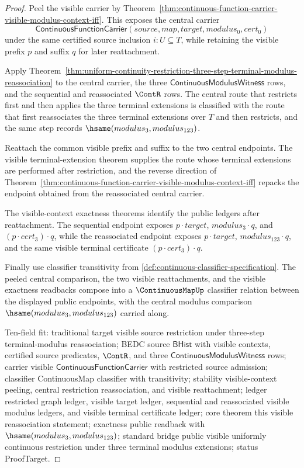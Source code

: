 \begin{proof}
Peel the visible carrier by Theorem~\ref{thm:continuous-function-carrier-visible-modulus-context-iff}. This exposes the central carrier
$$
\mathsf{ContinuousFunctionCarrier}(source,map,target,modulus_0,cert_0)
$$
under the same certified source inclusion $i:U\subseteq T$, while retaining the visible prefix $p$ and suffix $q$ for later reattachment.

Apply Theorem~\ref{thm:uniform-continuity-restriction-three-step-terminal-modulus-reassociation} to the central carrier, the three $\mathsf{ContinuousModulusWitness}$ rows, and the sequential and reassociated $\ContR$ rows. The central route that restricts first and then applies the three terminal extensions is classified with the route that first reassociates the three terminal extensions over $T$ and then restricts, and the same step records $\hsame(modulus_3,modulus_{123})$.

Reattach the common visible prefix and suffix to the two central endpoints. The visible terminal-extension theorem supplies the route whose terminal extensions are performed after restriction, and the reverse direction of Theorem~\ref{thm:continuous-function-carrier-visible-modulus-context-iff} repacks the endpoint obtained from the reassociated central carrier.

The visible-context exactness theorems identify the public ledgers after reattachment. The sequential endpoint exposes $p\cdot target$, $modulus_3\cdot q$, and $(p\cdot cert_3)\cdot q$, while the reassociated endpoint exposes $p\cdot target$, $modulus_{123}\cdot q$, and the same visible terminal certificate $(p\cdot cert_3)\cdot q$.

Finally use classifier transitivity from \autoref{def:continuous-classifier-specification}. The peeled central comparison, the two visible reattachments, and the visible exactness readbacks compose into a $\ContinuousMapUp$ classifier relation between the displayed public endpoints, with the central modulus comparison $\hsame(modulus_3,modulus_{123})$ carried along.

Ten-field fit: traditional target visible source restriction under three-step terminal-modulus reassociation; BEDC source $\mathsf{BHist}$ with visible contexts, certified source predicates, $\ContR$, and three $\mathsf{ContinuousModulusWitness}$ rows; carrier visible $\mathsf{ContinuousFunctionCarrier}$ with restricted source admission; classifier ContinuousMap classifier with transitivity; stability visible-context peeling, central restriction reassociation, and visible reattachment; ledger restricted graph ledger, visible target ledger, sequential and reassociated visible modulus ledgers, and visible terminal certificate ledger; core theorem this visible reassociation statement; exactness public readback with $\hsame(modulus_3,modulus_{123})$; standard bridge public visible uniformly continuous restriction under three terminal modulus extensions; status ProofTarget.
\end{proof}

